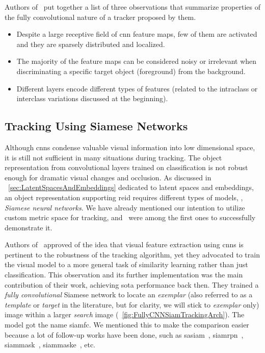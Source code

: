 Authors of~\cite{wang2015votcnn} put together a list of three observations that summarize properties of the fully convolutional nature of a tracker proposed by them.
\begin{itemize}
    \item Despite a large receptive field of \gls{cnn} feature maps, few of them are activated and they are sparsely distributed and localized.
    \item The majority of the feature maps can be considered noisy or irrelevant when discriminating a specific target object (foreground) from the background.
    \item Different layers encode different types of features (related to the intraclass or interclass variations discussed at the beginning).
\end{itemize}

\subsection{Tracking Using Siamese Networks}
\label{ssec:TrackingUsingSiameseNetworks}

Although \glspl{cnn} condense valuable visual information into low dimensional space, it is still not sufficient in many situations during tracking. The object representation from convolutional layers trained on classification is not robust enough for dramatic visual changes and occlusion. As discussed in \sectiontext{}~\ref{sec:LatentSpacesAndEmbeddings} dedicated to latent spaces and embeddings, an object representation supporting \gls{reid} requires different types of models, \ietext{}, \emph{Siamese neural networks}. We have already mentioned our intention to utilize custom metric space for tracking, and~\cite{bertinetto2016siamfc} were among the first ones to successfully demonstrate it.

Authors of~\cite{bertinetto2016siamfc} approved of the idea that visual feature extraction using \glspl{cnn} is pertinent to the robustness of the tracking algorithm, yet they advocated to train the visual model to a more general task of similarity learning rather than just classification. This observation and its further implementation was the main contribution of their work, achieving \gls{sota} performance back then. They trained a \emph{fully convolutional} Siamese network to locate an \emph{exemplar} (also referred to as a \emph{template} or \emph{target} in the literature, but for clarity, we will stick to \emph{exemplar} only) image within a larger \emph{search} image (\figtext{}~\ref{fig:FullyCNNSiamTrackingArch}). The model got the name \gls{siamfc}. We mentioned this to make the comparison easier because a lot of follow-up works have been done, such as \gls{sasiam}~\cite{he2018twofoldsiam}, \gls{siamrpn}~\cite{li2018siamrpn}, \gls{siammask}~\cite{wang2019siammask}, \gls{siammaske}~\cite{chen2019rotbboxes}, etc.

